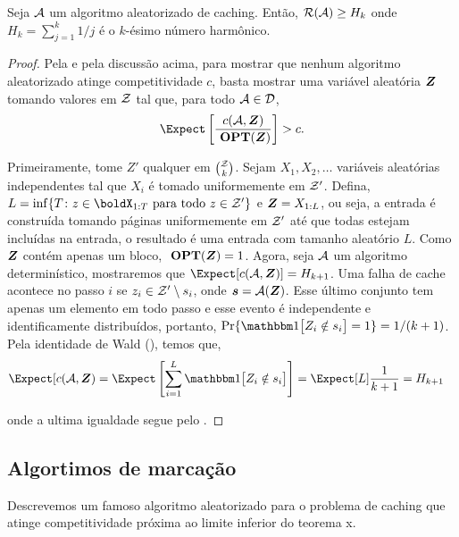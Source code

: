 \begin{theorem}
  Seja \(\mathcal{A}\) um algoritmo aleatorizado de caching. Então, \(\mathcal{R}(\mathcal{A}) \ge H_k\) onde \(H_k = \sum_{j = 1}^{k} 1/j\) é o \(k\)-ésimo número harmônico.
\begin{proof}
  Pela  e pela discussão acima, para mostrar que nenhum algoritmo aleatorizado atinge competitividade \(c\), basta mostrar uma variável aleatória \(\bm{Z}\) tomando valores em \(\mathcal{Z}\) tal que, para todo \(\mathcal{A} \in \mathcal{D}\),
  \begin{equation*}
    \Expect\left[\frac{c(\Acal, \boldZ)}{\opt(\boldZ)}\right] > c.
  \end{equation*}

  Primeiramente, tome \(Z'\) qualquer em \(\binom{\mathcal{Z}}{k}\). Sejam \(X_1, X_2, \dotsc\) variáveis aleatórias independentes tal que \(X_i\) é tomado uniformemente em \(\mathcal{Z}'\). Defina, \(L = \inf\{T \colon z \in \boldX_{1:T} \text{ para todo } z \in \Zcal'\}\) e \(\bm{Z} = X_{1:L}\), ou seja, a entrada é construída tomando páginas uniformemente em \(\mathcal{Z}'\) até que todas estejam incluídas na entrada, o resultado é uma entrada com tamanho aleatório \(L\). Como \(\bm{Z}\) contém apenas um bloco, \(\ \textbf{OPT}(\bm{Z}) = 1\). Agora, seja \(\mathcal{A}\) um algoritmo determinístico, mostraremos que \(\Expect[c(\Acal,\boldZ)] = H_{k+1}\). Uma falha de cache acontece no passo \(i\) se \(z_i \in \mathcal{Z}' \setminus s_i\), onde \(\bm{s} = \mathcal{A}(\bm{Z})\). Esse último conjunto tem apenas um elemento em todo passo e esse evento é independente e identificamente distribuídos, portanto, \(\Pr\{\ind{Z_i \notin s_i} = 1\} = 1/(k+1)\). Pela identidade de Wald (), temos que,
  \begin{align*}
    \Expect[c(\Acal, \boldZ) = \Expect\left[\sum_{i=1}^L \ind{Z_i \notin s_i}\right]
    &= \Expect[L]\frac{1}{k+1} = H_{k+1}
  \end{align*}

onde a ultima igualdade segue pelo .

\end{proof}
\end{theorem}

\subsection{Algortimos de marcação}

Descrevemos um famoso algoritmo aleatorizado para o problema de caching que atinge competitividade próxima ao limite inferior do teorema x. 

